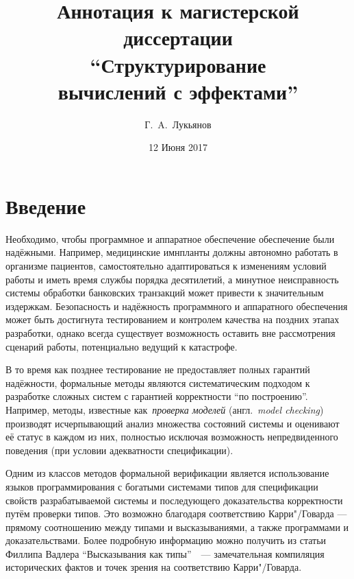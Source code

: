 \documentclass [fontsize=14pt, paper=a4, pagesize, DIV=calc]%
{article}
\begin{document}
\title{Аннотация к магистерской диссертации\\``Структурирование\\вычислений с эффектами''}
\author{Г.~A.~Лукьянов}
\date{12 Июня 2017}

\maketitle

\section{Введение}

Необходимо, чтобы программное и аппаратное обеспечение обеспечение были надёжными.
Например, медицинские имнпланты должны автономно работать в организме пациентов,
самостоятельно адаптироваться к изменениям условий работы и иметь время службы порядка
десятилетий, а минутное неисправность системы обработки банковских транзакций
может привести к значительным издержкам. Безопасность и надёжность программного и
аппаратного обеспечения может быть достигнута тестированием и контролем качества на
поздних этапах разработки, однако всегда существует возможность оставить вне
рассмотрения сценарий работы, потенциально ведущий к катастрофе.

В то время как позднее тестирование не предоставляет полных гарантий надёжности,
формальные методы являются систематическим подходом к разработке сложных систем
с гарантией корректности ``по построению''. Например, методы, известные
как~\emph{проверка моделей} (англ.~\emph{model checking}) производят исчерпывающий
анализ множества состояний системы и оценивают её статус в каждом из них, полностью
исключая возможность непредвиденного поведения (при условии адекватности спецификации).

Одним из классов методов формальной верификации является использование языков
программирования с богатыми системами типов для спецификации свойств разрабатываемой
системы и последующего доказательства корректности путём проверки типов.
Это возможно благодаря соответствию Карри"/Говарда --- прямому соотношению между
типами и высказываниями, а также программами и доказательствами. Более подробную
информацию можно получить из статьи Филлипа Вадлера
``Высказывания как типы''~\cite{Wadler:2015:PT:2847579.2699407}~---
замечательная компиляция исторических фактов и точек зрения на
соответствию Карри"/Говарда.
\end{document}
